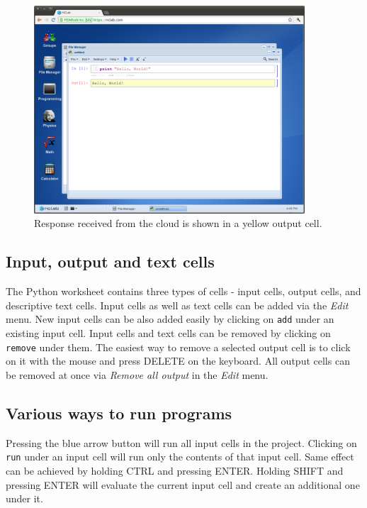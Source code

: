 \documentclass[article,A4,12pt]{llncs}
\begin{document}
\newpage

\begin{figure}[!ht]
\begin{center}
\includegraphics[width=0.9\textwidth]{img/python-2.png}
\end{center}
\vspace{-2mm}
\caption{Response received from the cloud is shown in a yellow output cell.}
\label{fig:python-2}
\end{figure}

\subsection{Input, output and text cells}

The Python worksheet contains three types of cells - input cells, output cells, 
and descriptive text cells. Input cells as well as text cells can be added via 
the {\em Edit} menu. New input cells can be also added easily by clicking on {\tt add} under
an existing input cell. Input cells and text cells can be removed by clicking on 
{\tt remove} under them. The easiest way to remove a selected output cell is to 
click on it with the mouse and press DELETE on the keyboard. 
All output cells can be removed at once via {\em Remove all output} in the {\em Edit} menu. 

\subsection{Various ways to run programs}

Pressing the blue arrow button will run all input cells in the project. Clicking 
on {\tt run} under an input cell will run only the contents of that input cell. 
Same effect can be achieved by holding CTRL and pressing ENTER. Holding SHIFT
and pressing ENTER will evaluate the current input cell and create an additional one
under it.
\end{document}
